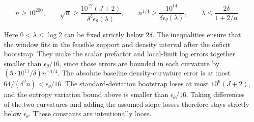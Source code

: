 \documentclass[11pt]{article}
\begin{document}
\[
n\ge10^{200},\qquad
\sqrt n\ge\frac{10^{12}(J+2)}{\delta^3\epsilon_\theta(\lambda)},\qquad
n^{1/4}\ge\frac{10^{14}}{\delta\epsilon_\theta(\lambda)},
\qquad
\lambda\le\frac{2\delta}{1+2/n}.
\]

Here $0<\lambda\le\log2$ can be fixed strictly below $2\delta$.
The inequalities ensure that the window fits in the feasible support
and density interval after the deficit bootstrap. They make the
scalar prefactor and local-limit log errors together smaller than
$\epsilon_\theta/16$, since those errors are bounded in each
curvature by $(5\cdot10^{11}/\delta)n^{-1/4}$.
The absolute baseline density-curvature error is at most
$64/(\delta^2 n)<\epsilon_\theta/16$. The standard-deviation bootstrap
loses at most $10^9(J+2)$, and the entropy variation bound above is
smaller than $\epsilon_\theta/16$. Taking differences of the two
curvatures and adding the assumed slope losses therefore stays
strictly below $\epsilon_\theta$. These constants are intentionally loose.
\end{document}
